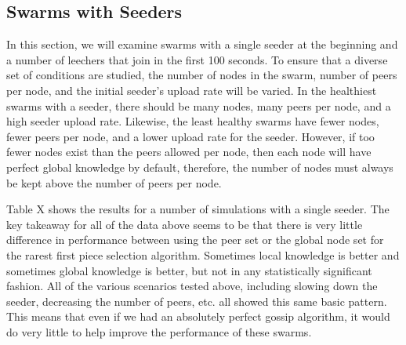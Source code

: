 \subsection{Swarms with Seeders}

In this section, we will examine swarms with a single seeder at the beginning
and a number of leechers that join in the first 100 seconds. To ensure
that a diverse set of conditions are studied, the number of nodes in the swarm, 
number of peers per node, and the initial seeder's upload rate will be varied.
In the healthiest swarms with a seeder, there should be many nodes, many peers per node, and
a high seeder upload rate. Likewise, the least healthy swarms have fewer nodes,
fewer peers per node, and a lower upload rate for the seeder. However, if too fewer
nodes exist than the peers allowed per node, then each node will have perfect global
knowledge by default, therefore, the number of nodes must always be kept above
the number of peers per node. 







Table X shows the results for a number of simulations with a single
seeder. The key takeaway for all of the data above seems to be that there
is very little difference in performance between using the peer set or the
global node set for the rarest first piece selection algorithm. Sometimes
local knowledge is better and sometimes global knowledge is better,
but not in any statistically significant fashion. All of the various
scenarios tested above, including slowing down the seeder, decreasing
the number of peers, etc. all showed this same basic pattern. This means
that even if we had an absolutely perfect gossip algorithm, it would do
very little to help improve the performance of these swarms.

